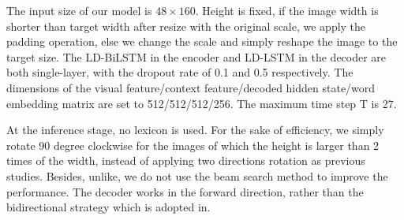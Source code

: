 \documentclass[runningheads]{llncs}
\begin{document}
The input size of our model is $48\times160$. Height is fixed, if the image width is shorter than target width after resize with the original scale, we apply the padding operation, else we change the scale and simply reshape the image to the target size. The LD-BiLSTM in the encoder and LD-LSTM in the decoder are both single-layer, with the dropout rate of 0.1 and 0.5 respectively. The dimensions of the visual feature/context feature/decoded hidden state/word embedding matrix are set to 512/512/512/256. The maximum time step T is 27.

At the inference stage, no lexicon is used. For the sake of efficiency, we simply rotate 90 degree clockwise for the images of which the height is larger than 2 times of the width, instead of applying two directions rotation as previous studies\cite{shi2018aster,litman2020scatter,li2019show,lu2019master,yue2020robustscanner}. Besides, unlike\cite{shi2018aster,li2019show}, we do not use the beam search method to improve the performance. The decoder works in the forward direction, rather than the bidirectional strategy which is adopted in\cite{shi2018aster,yang2020holistic}.
\end{document}
